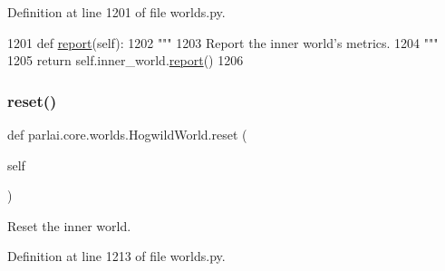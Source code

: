 Definition at line 1201 of file worlds.\+py.


\begin{DoxyCode}
1201     \textcolor{keyword}{def }\hyperlink{namespaceprojects_1_1convai2_1_1eval__f1_a01a47b9c08dad189837a51f085defc45}{report}(self):
1202         \textcolor{stringliteral}{"""}
1203 \textcolor{stringliteral}{        Report the inner world's metrics.}
1204 \textcolor{stringliteral}{        """}
1205         \textcolor{keywordflow}{return} self.inner\_world.\hyperlink{namespaceprojects_1_1convai2_1_1eval__f1_a01a47b9c08dad189837a51f085defc45}{report}()
1206 
\end{DoxyCode}
\mbox{\label{classparlai_1_1core_1_1worlds_1_1HogwildWorld_ae72983e6af34391880979491ced1dde6}} 
\subsubsection{\texorpdfstring{reset()}{reset()}}
{\footnotesize\ttfamily def parlai.\+core.\+worlds.\+Hogwild\+World.\+reset (\begin{DoxyParamCaption}\item[{}]{self }\end{DoxyParamCaption})}

\begin{DoxyVerb}Reset the inner world.
\end{DoxyVerb}
 

Definition at line 1213 of file worlds.\+py.


